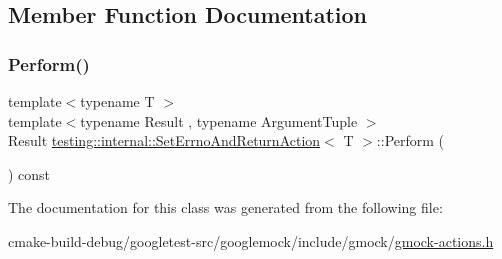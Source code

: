 \subsection{Member Function Documentation}
\mbox{\label{classtesting_1_1internal_1_1SetErrnoAndReturnAction_a44025d0d124cab72878bf6bdb12c3693}} 
\subsubsection{\texorpdfstring{Perform()}{Perform()}}
{\footnotesize\ttfamily template$<$typename T $>$ \\
template$<$typename Result , typename Argument\+Tuple $>$ \\
Result \mbox{\hyperlink{classtesting_1_1internal_1_1SetErrnoAndReturnAction}{testing\+::internal\+::\+Set\+Errno\+And\+Return\+Action}}$<$ T $>$\+::Perform (\begin{DoxyParamCaption}\item[{const Argument\+Tuple \&}]{ }\end{DoxyParamCaption}) const\hspace{0.3cm}{\ttfamily [inline]}}



The documentation for this class was generated from the following file\+:\begin{DoxyCompactItemize}
\item 
cmake-\/build-\/debug/googletest-\/src/googlemock/include/gmock/\mbox{\hyperlink{gmock-actions_8h}{gmock-\/actions.\+h}}\end{DoxyCompactItemize}
